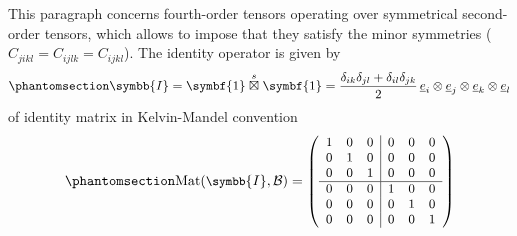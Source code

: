 \documentclass[
  a4paper,
  numbers=noendperiod,
  DIV=12]{scrreprt}
\newcommand{\uu}[1]{{\symbf{{#1}}}}
\newcommand{\uuuu}[1]{{\symbb{{#1}}}}
\newcommand{\uv}[1]{{\underline{{#1}}}}
\newcommand{\ve}[1]{{\uv{{e}}_{{#1}}}}
\newcommand{\sboxtimes}{\stackrel{s}{\boxtimes}}
\DeclareMathOperator{\Mat}{Mat}
\begin{document}
This paragraph concerns fourth-order tensors operating over symmetrical
second-order tensors, which allows to impose that they satisfy the minor
symmetries (\(C_{jikl}=C_{ijlk}=C_{ijkl}\)). The identity operator is
given by \begin{equation}\protect\phantomsection\label{eq-tensI}{
\uuuu{I}=\uu{1}\sboxtimes\uu{1}=
\frac{\delta_{ik}\delta_{jl}+\delta_{il}\delta_{jk}}{2}\,\ve{i}\otimes\ve{j}\otimes\ve{k}\otimes\ve{l}
}\end{equation} of identity matrix in Kelvin-Mandel convention
\begin{equation}\protect\phantomsection\label{eq-matI}{
\small
\Mat(\uuuu{I},\mathcal{B})=
   \left(
   \begin{array}{ccc|ccc}
   1 & 0 & 0 & 0 & 0 & 0 \\
   0 & 1 & 0 & 0 & 0 & 0 \\
   0 & 0 & 1 & 0 & 0 & 0 \\
   \hline
   0 & 0 & 0 & 1 & 0 & 0 \\
   0 & 0 & 0 & 0 & 1 & 0 \\
   0 & 0 & 0 & 0 & 0 & 1 \\
   \end{array}
   \right)
}\end{equation}
\end{document}
